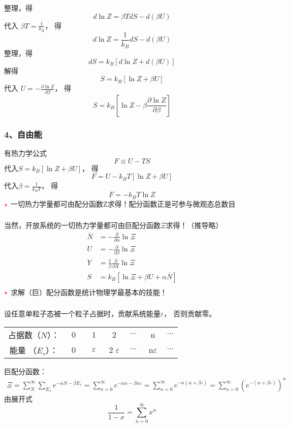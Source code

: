 \begin{frame}
  \frametitle{}
整理，得
\[ d \ln Z  = \beta TdS - d (\beta U) \]
代入 $\beta T = \frac{1}{k_B}$， 得
\[ d \ln Z  = \frac{1}{k_B} dS - d (\beta U) \]
整理，得
\[ dS = k_B \left[ d \ln Z + d (\beta U) \right] \]
解得 
\[ S = k_B \left[  \ln Z +  \beta U \right] \]
代入 $U = -  \frac{\partial \ln Z}{\partial \beta } $， 得 
\[ \boxed{S = k_B \left[  \ln Z -  \beta \frac{\partial \ln Z}{\partial \beta }  \right]} \]
\end{frame} 

\begin{frame}
  \frametitle{ 4、自由能}
  有热力学公式
  \[ F \equiv  U - TS \]
  代入$S = k_B \left[  \ln Z +  \beta U \right]$， 得 
  \[ F =  U - k_BT \left[  \ln Z +  \beta U \right] \]
  代入$\beta = \frac{1}{k_B T} $， 得 
  \[ \boxed{F =  - k_BT \ln Z }\]
  ${\color{red}\star}$ 一切热力学量都可由配分函数Z求得！配分函数正是可参与微观态总数目
\end{frame} 

\begin{frame}
  \frametitle{}
当然，开放系统的一切热力学量都可由巨配分函数$\Xi$求得！（推导略） 
\[
\begin{aligned}
  \overline{N} &= - \frac{\partial }{\partial \alpha } \ln \Xi \\
U &= - \frac{\partial }{\partial \beta} \ln \Xi \\
Y &= \frac{1}{\beta} \frac{\partial }{\partial X} \ln \Xi \\
S &= k_B [ \ln \Xi + \beta U + \alpha \overline{N} ]\\
\end{aligned} 
  \]
  ${\color{red}\star}$ 求解（巨）配分函数是统计物理学最基本的技能！
\end{frame} 

\begin{frame}
  \frametitle{}
  \解 设任意单粒子态被一个粒子占据时，贡献系统能量$\varepsilon$， 否则贡献零。
\begin{table}[htbp]
  \centering\begin{tabular}{ccccccc}
    占据数（$N$）： & ~0~ & ~1~ & ~2~ & $~\cdots~$ & ~n~ & $\cdots$ \\
    能量 （$E_s$）： &  0 & $\varepsilon$ & 2 $\varepsilon$ & $\cdots$ & n$\varepsilon$ & $\cdots$ \\
  \end{tabular}
\end{table}
巨配分函数：$$ 
\begin{aligned}
  \Xi = \sum_{N} ^\infty \sum_{E_s} e^{-\alpha N -\beta E_s}  
  = \sum_{n=0}^\infty e^{-\alpha n -\beta n \varepsilon }  
  = \sum_{n=0}^\infty e^{-n(\alpha +\beta \varepsilon)} 
  = \sum_{n=0}^\infty \left(e^{-(\alpha +\beta \varepsilon)}\right)^n 
\end{aligned}
$$ 
由展开式
\[ \frac{1}{1-x} = \sum_{n=0}^{\infty} x^n\]
\end{frame} 

